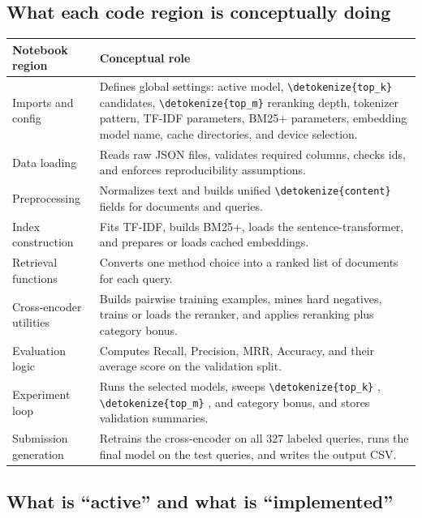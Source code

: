 \documentclass[10pt]{article}
\DeclareRobustCommand{\code}[1]{%
  \ifmmode
    \text{\nolinkurl{\detokenize{#1}}}%
  \else
    \nolinkurl{\detokenize{#1}}%
  \fi
}
\begin{document}
\subsection{What each code region is conceptually doing}

\begin{center}
\begin{tabular}{@{}p{}p{}@{}}
\toprule
\textbf{Notebook region} & \textbf{Conceptual role} \\
\midrule
Imports and config & Defines global settings: active model, \code{top_k} candidates, \code{top_m} reranking depth, tokenizer pattern, TF-IDF parameters, BM25+ parameters, embedding model name, cache directories, and device selection. \\
Data loading & Reads raw JSON files, validates required columns, checks ids, and enforces reproducibility assumptions. \\
Preprocessing & Normalizes text and builds unified \code{content} fields for documents and queries. \\
Index construction & Fits TF-IDF, builds BM25+, loads the sentence-transformer, and prepares or loads cached embeddings. \\
Retrieval functions & Converts one method choice into a ranked list of documents for each query. \\
Cross-encoder utilities & Builds pairwise training examples, mines hard negatives, trains or loads the reranker, and applies reranking plus category bonus. \\
Evaluation logic & Computes Recall, Precision, MRR, Accuracy, and their average score on the validation split. \\
Experiment loop & Runs the selected models, sweeps \code{top_k}, \code{top_m}, and category bonus, and stores validation summaries. \\
Submission generation & Retrains the cross-encoder on all 327 labeled queries, runs the final model on the test queries, and writes the output CSV. \\
\bottomrule
\end{tabular}
\end{center}

\subsection{What is ``active'' and what is ``implemented''}
\end{document}
